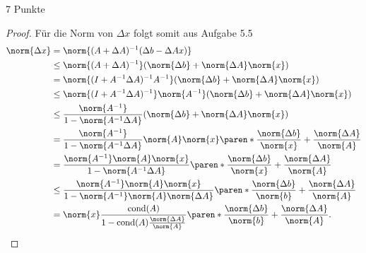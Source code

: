 \documentclass{problemset}
\begin{document}
\begin{problem}{7 Punkte}
\begin{proof}
    Für die Norm von \(\Delta x\) folgt somit aus Aufgabe 5.5
    \begin{align*}
        \norm{\Delta x} & = \norm{(A + \Delta A)^{-1} (\Delta b - \Delta Ax)}                                                \\
                        & \leq \norm{(A + \Delta A)^{-1}} (\norm{\Delta b} + \norm{\Delta A} \norm{x})                       \\
                        & = \norm{(I + A^{-1} \Delta A)^{-1} A^{-1}} (\norm{\Delta b} + \norm{\Delta A} \norm{x})            \\
                        & \leq \norm{(I + A^{-1} \Delta A)^{-1}} \norm{A^{-1}} (\norm{\Delta b} + \norm{\Delta A} \norm{x})  \\
                        & \leq \frac{\norm{A^{-1}}}{1 - \norm{A^{-1} \Delta A}} (\norm{\Delta b} + \norm{\Delta A} \norm{x}) \\
                        & = \frac{\norm{A^{-1}}}{1 - \norm{A^{-1} \Delta A}} \norm{A} \norm{x}
        \paren*{\frac{\norm{\Delta b}}{\norm{x}} + \frac{\norm{\Delta A}}{\norm{A}}}                                         \\
                        & = \frac{\norm{A^{-1}} \norm{A} \norm{x}}{1 - \norm{A^{-1} \Delta A}}
        \paren*{\frac{\norm{\Delta b}}{\norm{x}} + \frac{\norm{\Delta A}}{\norm{A}}}                                         \\
                        & \leq \frac{\norm{A^{-1}} \norm{A} \norm{x}}{1 - \norm{A^{-1}} \norm{A} \norm{\Delta A}}
        \paren*{\frac{\norm{\Delta b}}{\norm{b}} + \frac{\norm{\Delta A}}{\norm{A}}}                                         \\
                        & = \norm{x} \frac{\cond(A)}{1 - \cond(A) \frac{\norm{\Delta A}}{\norm{A}}}
        \paren*{\frac{\norm{\Delta b}}{\norm{b}} + \frac{\norm{\Delta A}}{\norm{A}}}.
    \end{align*}
\end{proof}
\end{problem}
\end{document}
